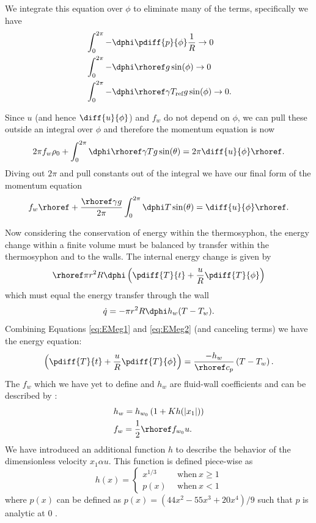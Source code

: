 We integrate this equation over $\phi$ to eliminate many of the terms, specifically we have
\begin{align*}
& \int _{0} ^{2\pi} -\dphi \pdiff{p}{\phi} \frac{1}{R} \rightarrow 0\\
& \int _{0} ^{2\pi} -\dphi \rhoref g \sin (\phi) \rightarrow 0\\
& \int _{0} ^{2\pi} -\dphi \rhoref \gamma T_\text{ref} g \sin (\phi) \rightarrow 0.\end{align*}

Since $u$ (and hence $\diff{u}{\phi}$) and $f_w$ do not depend on $\phi$, we can pull these outside an integral over $\phi$ and therefore the momentum equation is now 
\begin{equation*} 2\pi f_w \rho _0 + \int _{0} ^{2\pi} \dphi \rhoref \gamma T g \sin (\theta) = 2\pi \diff{u}{\phi} \rhoref .\end{equation*}
Diving out $2\pi$ and pull constants out of the integral we have our final form of the momentum equation
\begin{equation} f_w \rhoref + \frac{\rhoref \gamma g }{2 \pi} \int _{0} ^{2\pi} \dphi T \sin (\theta) = \diff{u}{\phi} \rhoref \label{eq:EM10}.\end{equation}

Now considering the conservation of energy within the thermosyphon, the energy change within a finite volume must be balanced by transfer within the thermosyphon and to the walls.
The internal energy change is given by
\begin{equation} \rhoref \pi r^2 R \dphi \left ( \pdiff{T}{t} + \frac{u}{R}\pdiff{T}{\phi} \right ) \label{eq:EMeg1}\end{equation}
which must equal the energy transfer through the wall
\begin{equation} \dot{q} = -\pi r^2 R \dphi h_w (T - T_w) . \label{eq:EMeg2} \end{equation}
Combining Equations \ref{eq:EMeg1} and \ref{eq:EMeg2} (and canceling terms) we have the energy equation:
\begin{equation} \left ( \pdiff{T}{t} + \frac{u}{R}\pdiff{T}{\phi} \right ) = \frac{-h_w}{\rhoref c_p} \left( T - T_w \right ) \label{eq:EMeq}.\end{equation}
The $f_w$ which we have yet to define and $h_w$ are fluid-wall coefficients and can be described by :
\begin{align*} & h_w = h_{w_0} \left ( 1 + K h(|x_1|) \right ) \\
& f_w = \frac{1}{2} \rhoref f_{w_0} u .\end{align*}
We have introduced an additional function $h$ to describe the behavior of the dimensionless velocity $x_1 \alpha u$.
This function is defined piece-wise as 
\begin{equation*} h (x) = \left \{ \begin{array}{ll} x^{1/3} & ~~\text{when} ~x \geq 1\\ p (x) & ~~\text{when} ~ x <1 \end{array} \right. \end{equation*} 
where $p(x)$ can be defined as $p(x) = \left( 44x^2 -55 x^3 + 20x^4 \right ) /9$ such that $p$ is analytic at 0 .

